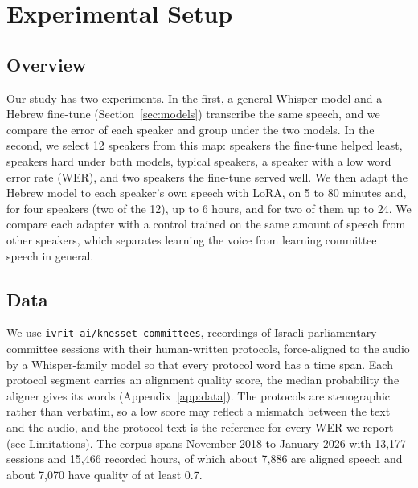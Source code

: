 \documentclass[11pt]{article}
\begin{document}
\section{Experimental Setup}


\subsection{Overview}
\label{sec:overview}

Our study has two experiments. In the first, a general Whisper model and a
Hebrew fine-tune (Section~\ref{sec:models}) transcribe the same speech, and we
compare the error of each speaker and group under the two models. In the second, we select 12 speakers from this map: speakers
the fine-tune helped least, speakers hard under both models, typical speakers, a
speaker with a low word error rate (WER), and two speakers the fine-tune served well. We then adapt the Hebrew model to each speaker's own speech
with LoRA, on 5 to 80 minutes and, for four speakers (two of the 12), up to 6 hours, and for two of them up to 24. We compare each adapter with a control trained on the
same amount of speech from other speakers, which separates learning the voice
from learning committee speech in general.


\subsection{Data}
\label{sec:data}

We use \texttt{ivrit-ai/knesset-committees}, recordings of Israeli parliamentary
committee sessions with their human-written protocols, force-aligned to the
audio by a Whisper-family model so that every protocol word has a time span. Each protocol segment carries an
alignment quality score, the median probability the
aligner gives its words (Appendix~\ref{app:data}). The protocols are stenographic rather than
verbatim, so a low score may reflect a mismatch between the text and the audio,
and the protocol text is the reference for every WER we report (see
Limitations). The
corpus spans November 2018 to January 2026 with 13{,}177 sessions and 15{,}466
recorded hours, of which about 7{,}886 are aligned speech and about 7{,}070 have quality of at least 0.7.
\end{document}
